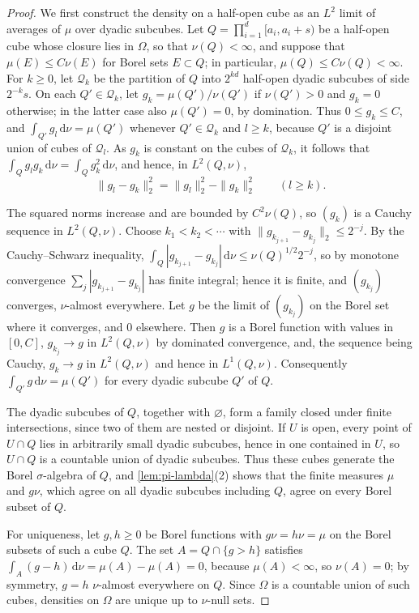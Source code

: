 \begin{proof}
We first construct the density on a half-open cube as an $L^2$ limit of averages of $\mu$ over dyadic subcubes. Let $Q=\prod_{i=1}^d[a_i,a_i+s)$ be a half-open cube whose closure lies in $\Omega$, so that $\nu(Q)<\infty$, and suppose that $\mu(E)\leq C\nu(E)$ for Borel sets $E\subset Q$; in particular, $\mu(Q)\leq C\nu(Q)<\infty$. For $k\geq0$, let $\mathcal Q_k$ be the partition of $Q$ into $2^{kd}$ half-open dyadic subcubes of side $2^{-k}s$. On each $Q'\in\mathcal Q_k$, let $g_k=\mu(Q')/\nu(Q')$ if $\nu(Q')>0$ and $g_k=0$ otherwise; in the latter case also $\mu(Q')=0$, by domination. Thus $0\leq g_k\leq C$, and $\int_{Q'}g_l\,\mathrm d\nu=\mu(Q')$ whenever $Q'\in\mathcal Q_k$ and $l\geq k$, because $Q'$ is a disjoint union of cubes of $\mathcal Q_l$. As $g_k$ is constant on the cubes of $\mathcal Q_k$, it follows that $\int_Qg_lg_k\,\mathrm d\nu=\int_Qg_k^2\,\mathrm d\nu$, and hence, in $L^2(Q,\nu)$,
\[
 \|g_l-g_k\|_2^2=\|g_l\|_2^2-\|g_k\|_2^2\qquad(l\geq k).
\]

The squared norms increase and are bounded by $C^2\nu(Q)$, so $(g_k)$ is a Cauchy sequence in $L^2(Q,\nu)$. Choose $k_1<k_2<\cdots$ with $\|g_{k_{j+1}}-g_{k_j}\|_2\leq2^{-j}$. By the Cauchy--Schwarz inequality, $\int_Q|g_{k_{j+1}}-g_{k_j}|\,\mathrm d\nu\leq\nu(Q)^{1/2}2^{-j}$, so by monotone convergence $\sum_j|g_{k_{j+1}}-g_{k_j}|$ has finite integral; hence it is finite, and $(g_{k_j})$ converges, $\nu$-almost everywhere. Let $g$ be the limit of $(g_{k_j})$ on the Borel set where it converges, and $0$ elsewhere. Then $g$ is a Borel function with values in $[0,C]$, $g_{k_j}\to g$ in $L^2(Q,\nu)$ by dominated convergence, and, the sequence being Cauchy, $g_k\to g$ in $L^2(Q,\nu)$ and hence in $L^1(Q,\nu)$. Consequently $\int_{Q'}g\,\mathrm d\nu=\mu(Q')$ for every dyadic subcube $Q'$ of $Q$.

The dyadic subcubes of $Q$, together with $\varnothing$, form a family closed under finite intersections, since two of them are nested or disjoint. If $U$ is open, every point of $U\cap Q$ lies in arbitrarily small dyadic subcubes, hence in one contained in $U$, so $U\cap Q$ is a countable union of dyadic subcubes. Thus these cubes generate the Borel $\sigma$-algebra of $Q$, and \cref{lem:pi-lambda}(2) shows that the finite measures $\mu$ and $g\nu$, which agree on all dyadic subcubes including $Q$, agree on every Borel subset of $Q$.

For uniqueness, let $g,h\geq0$ be Borel functions with $g\nu=h\nu=\mu$ on the Borel subsets of such a cube $Q$. The set $A=Q\cap\{g>h\}$ satisfies $\int_A(g-h)\,\mathrm d\nu=\mu(A)-\mu(A)=0$, because $\mu(A)<\infty$, so $\nu(A)=0$; by symmetry, $g=h$ $\nu$-almost everywhere on $Q$. Since $\Omega$ is a countable union of such cubes, densities on $\Omega$ are unique up to $\nu$-null sets.


\end{proof}

